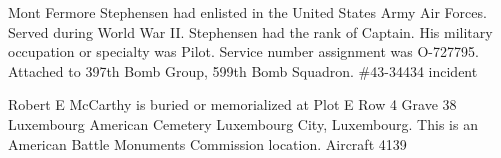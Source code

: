 \documentclass{article}
\begin{document}
\begin{multicols}{3}
% 

% 
% 

\begin{window} Mont Fermore Stephensen had enlisted in the United States Army Air Forces. Served during World War II. Stephensen had the rank of Captain. His military occupation or specialty was Pilot. Service number assignment was O-727795. Attached to 397th Bomb Group, 599th Bomb Squadron. \#43-34434 incident
%
\end{window}

\closearticle


Robert E McCarthy is buried or memorialized at Plot E Row 4 Grave 38 Luxembourg American Cemetery Luxembourg City, Luxembourg. This is an American Battle Monuments Commission location.
Aircraft 4139

\closearticle



\end{multicols}
\end{document}
